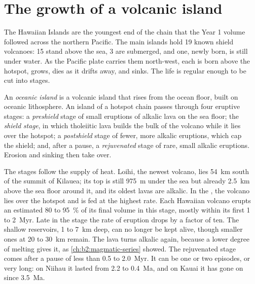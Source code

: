 \section{The growth of a volcanic island}\label{sec:b2:oceanic-islands:growth}

The Hawaiian Islands are the youngest end of the chain that the Year 1 volume followed across the
northern Pacific. The main islands hold 19 known shield volcanoes: 15 stand above the sea,
3 are submerged, and one, newly born, is still under water. As the Pacific plate carries them
north-west, each is born above the hotspot, grows, dies as it drifts away, and sinks. The life is
regular enough to be cut into stages.

\begin{definition}\label{def:b2:oceanic-islands:stages}
An \emph{oceanic island} is a volcanic island that rises from the ocean
floor, built on oceanic lithosphere. An island of a hotspot chain passes through four eruptive
stages: a \emph{preshield} stage of small eruptions of alkalic lava on the sea floor; the
\emph{shield stage}, in which tholeiitic lava builds the bulk of the volcano
while it lies over the hotspot; a \emph{postshield} stage of fewer, more alkalic eruptions,
which cap the shield; and, after a pause, a \emph{rejuvenated} stage of rare, small alkalic
eruptions. Erosion and sinking then take over.
\end{definition}

The stages follow the supply of heat. Loihi, the newest volcano, lies \qty{54}{km} south of the
summit of Kilauea; its top is still \qty{975}{m} under the sea but already \qty{2.5}{km} above the
sea floor around it, and its oldest lavas are alkalic. In the , the volcano lies over
the hotspot and is fed at the highest rate. Each Hawaiian volcano erupts an estimated 80 to
\qty{95}{\percent} of its final volume in this stage, mostly within its first 1 to \qty{2}{Myr}.
Late in the stage the rate of eruption drops by a factor of ten. The shallow  reservoirs, 1
to \qty{7}{km} deep, can no longer be kept alive, though smaller ones at 20 to \qty{30}{km}
remain. The lava turns alkalic again, because a lower degree of melting gives it, as
\cref{ch:b2:magmatic-series} showed. The rejuvenated stage comes after a pause of less than 0.5
to \qty{2.0}{Myr}. It can be one or two episodes, or very long: on Niihau it lasted from 2.2 to
\qty{0.4}{Ma}, and on Kauai it has gone on since \qty{3.5}{Ma}.

